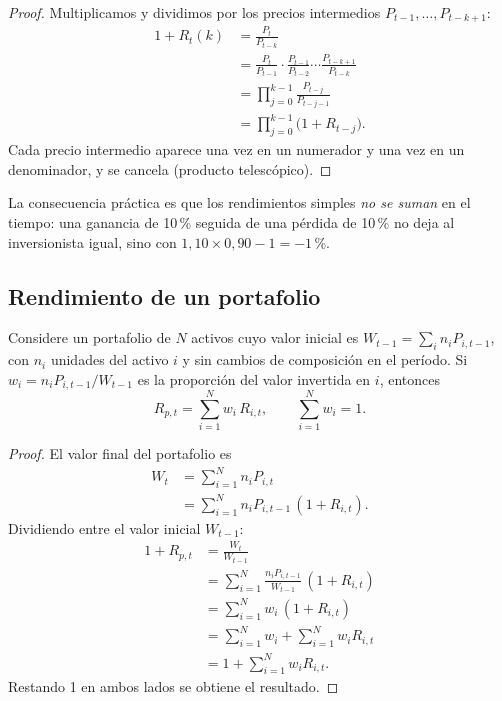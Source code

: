 \begin{proof}
Multiplicamos y dividimos por los precios intermedios $P_{t-1},\dots,P_{t-k+1}$:
\begin{align*}
  1+R_t(k) &= \frac{P_t}{P_{t-k}}\\
           &= \frac{P_t}{P_{t-1}}\cdot\frac{P_{t-1}}{P_{t-2}}\cdots\frac{P_{t-k+1}}{P_{t-k}}\\
           &= \prod_{j=0}^{k-1}\frac{P_{t-j}}{P_{t-j-1}}\\
           &= \prod_{j=0}^{k-1}\bigl(1+R_{t-j}\bigr).
\end{align*}
Cada precio intermedio aparece una vez en un numerador y una vez en un denominador, y se cancela
(producto telescópico).
\end{proof}

La consecuencia práctica es que los rendimientos simples \emph{no se suman} en el tiempo: una ganancia
de 10\,\% seguida de una pérdida de 10\,\% no deja al inversionista igual, sino con
$1{,}10\times 0{,}90-1=-1$\,\%.

\subsection{Rendimiento de un portafolio}

\begin{proposicion}\label{prop:portafolio}
Considere un portafolio de $N$ activos cuyo valor inicial es $W_{t-1}=\sum_i n_iP_{i,t-1}$, con $n_i$
unidades del activo $i$ y sin cambios de composición en el período. Si $w_i=n_iP_{i,t-1}/W_{t-1}$ es
la proporción del valor invertida en $i$, entonces
\[
  R_{p,t}=\sum_{i=1}^{N}w_i\,R_{i,t},\qquad \sum_{i=1}^N w_i=1 .
\]
\end{proposicion}

\begin{proof}
El valor final del portafolio es
\begin{align*}
  W_t &= \sum_{i=1}^N n_iP_{i,t}\\
      &= \sum_{i=1}^N n_iP_{i,t-1}\,(1+R_{i,t}).
\end{align*}
Dividiendo entre el valor inicial $W_{t-1}$:
\begin{align*}
  1+R_{p,t} &= \frac{W_t}{W_{t-1}}\\
            &= \sum_{i=1}^N\frac{n_iP_{i,t-1}}{W_{t-1}}\,(1+R_{i,t})\\
            &= \sum_{i=1}^N w_i\,(1+R_{i,t})\\
            &= \sum_{i=1}^N w_i+\sum_{i=1}^N w_iR_{i,t}\\
            &= 1+\sum_{i=1}^N w_iR_{i,t}.
\end{align*}
Restando 1 en ambos lados se obtiene el resultado.
\end{proof}


